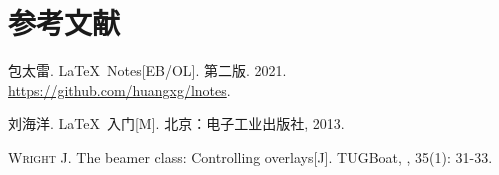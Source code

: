 \documentclass[
    aspectratio=169,  %
]{ctexbeamer}
\begin{document}
\part{参考文献}
\begin{frame}[allowframebreaks]

  \printbibliography[heading=none]
\end{frame}

\begin{frame}
  \begin{bibliolist}{00}
    \onlineitem 包太雷.
    \newblock \LaTeX\ Notes[EB/OL].
    \newblock 第二版. 2021. \url{https://github.com/huangxg/lnotes}.

    \bookitem 刘海洋.
    \newblock \LaTeX\ 入门[M].
    \newblock 北京：电子工业出版社, 2013.

    \articleitem \textsc{Wright J.}
    \newblock The beamer class: Controlling overlays[J].
    \newblock TUGBoat,
    , 35(1): 31-33.
  \end{bibliolist}
\end{frame}

\makebottom
\end{document}
